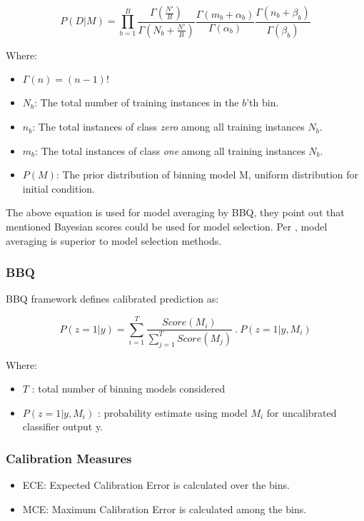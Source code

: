 \documentclass[11pt]{article}
\begin{document}
      $$
      P(D|M) = \prod_{b=1}^{B} \frac{\Gamma(\frac{N'}{B})}{\Gamma (N_b + \frac{N'}{B})}
      \frac{\Gamma (m_b + \alpha_b)}{\Gamma (\alpha_b)}
      \frac{\Gamma (n_b + \beta_b)}{\Gamma (\beta_b)}
      $$

      Where:
      \begin{itemize}
      \item $\Gamma(n) = (n-1)!$
      \item $N_b$: The total number of training instances in the $b$'th bin.
      \item $n_b$: The total instances of class \textit{zero} among all training
      instances $N_b$.
      \item $m_b$: The total instances of class \textit{one} among all training
      instances $N_b$.
      \item $P(M)$: The prior distribution of binning model M, uniform
      distribution for initial condition.
      \end{itemize}

      \par The above equation is used for model averaging by BBQ, they point
      out that mentioned Bayesian scores could be used for model selection. Per
      \cite{hoeting1999bayesian}, model averaging is superior to model
      selection methods.

      \subsubsection{BBQ}
      BBQ framework defines calibrated prediction as:

      $$
      P(z=1|y) = \sum_{i=1}^{T} \frac{\textit{Score}(M_i)}{\sum_{j=1}^{T} \textit{Score}(M_j)}
      ~.~ P(z=1 | y, M_i)
      $$

      Where:
      \begin{itemize}
            \item $T$ : total number of binning models considered
            \item $P(z=1 | y, M_i)$ : probability estimate using model $M_i$ for uncalibrated
      classifier output y.
      \end{itemize}


      \subsubsection{Calibration Measures}
      \begin{itemize}
            \item ECE: Expected Calibration Error is calculated over the bins.
            \item MCE: Maximum Calibration Error is calculated among the bins.
      \end{itemize}
\end{document}
